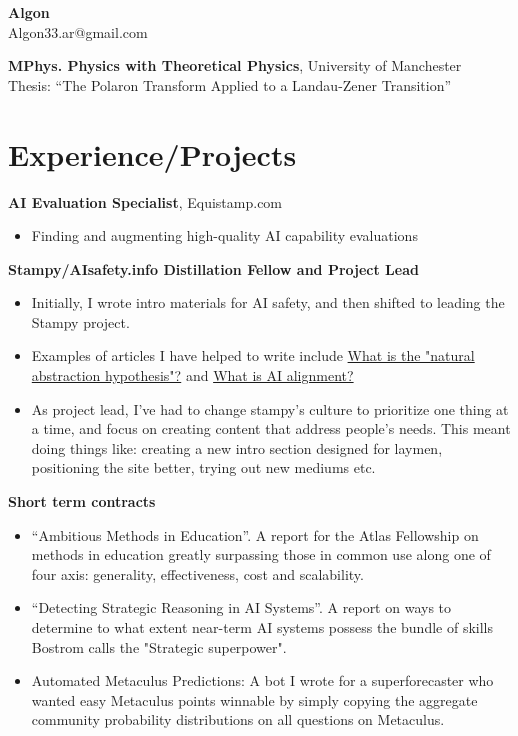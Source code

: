 \documentclass{article}
\begin{document}
\vspace*{-40pt}  %
\begin{center}
    \huge\textbf{Algon}\\[3pt]  %
    \small Algon33.ar@gmail.com
\end{center}
\vspace{10pt}  %


\textbf{MPhys. Physics with Theoretical Physics}, University of Manchester\\
Thesis: ``The Polaron Transform Applied to a Landau-Zener Transition'' 

\section*{Experience/Projects}
\vspace{10pt}  %
\textbf{AI Evaluation Specialist}, Equistamp.com
\begin{itemize}
    \item Finding and augmenting high-quality AI capability evaluations
\end{itemize}

\textbf{Stampy/AIsafety.info Distillation Fellow and Project Lead}
\begin{itemize}
    \item Initially, I wrote intro materials for AI safety, and then shifted to leading the Stampy project. 
    \item Examples of articles I have helped to write include \href{https://aisafety.info/questions/8OGF/What-is-the-"natural-abstraction-hypothesis"}{What is the "natural abstraction hypothesis"?}  and \href{https://aisafety.info/questions/8EL9/What-is-AI-alignment}{What is AI alignment?}
    \item As project lead, I've had to change stampy's culture to prioritize one thing at a time, and focus on creating content that address people's needs. This meant doing things like: creating a new intro section designed for laymen, positioning the site better, trying out new mediums etc. 

\end{itemize}

\textbf{Short term contracts}
\begin{itemize}
    \item ``Ambitious Methods in Education''. A report for the Atlas Fellowship on methods in education greatly surpassing those in common use along one of four axis: generality, effectiveness, cost and scalability.   
    \item ``Detecting Strategic Reasoning in AI Systems''. A report on ways to determine to what extent near-term AI systems possess the bundle of skills Bostrom calls the "Strategic superpower".   
    \item Automated Metaculus Predictions: A bot I wrote for a superforecaster who wanted easy Metaculus points winnable by simply copying the aggregate community probability distributions on all questions on Metaculus.  
\end{itemize}
\end{document}
